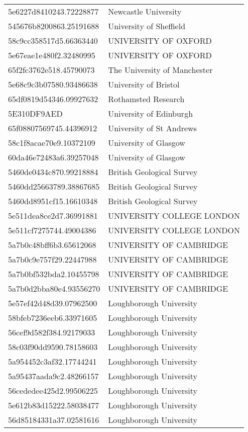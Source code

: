 \begin{tabular}{ll}
5e6227d8410243.72228877 & Newcastle University \\
545676b8200863.25191688 & University of Sheffield \\
58c9cc358517d5.66363440 & UNIVERSITY OF OXFORD \\
5e67eae1e480f2.32480995 & UNIVERSITY OF OXFORD \\
65f2fc3762e518.45790073 & The University of Manchester \\
5e68c9c3b07580.93486638 & University of Bristol \\
65df0819d54346.09927632 & Rothamsted Research \\
5E310DF9AED & University of Edinburgh \\
65f08807569745.44396912 & University of St Andrews \\
58c1f8acae70e9.10372109 & University of Glasgow \\
60da46e72483a6.39257048 & University of Glasgow \\
5460de0434c870.99218884 & British Geological Survey \\
5460dd25663789.38867685 & British Geological Survey \\
5460dd8951cf15.16610348 & British Geological Survey \\
5e511dea8ce2d7.36991881 & UNIVERSITY COLLEGE LONDON \\
5e511cf7275744.49004386 & UNIVERSITY COLLEGE LONDON \\
5a7b0c48bff6b3.65612068 & UNIVERSITY OF CAMBRIDGE \\
5a7b0c9e757f29.22447988 & UNIVERSITY OF CAMBRIDGE \\
5a7b0bf532bda2.10455798 & UNIVERSITY OF CAMBRIDGE \\
5a7b0d2bba80e4.93556270 & UNIVERSITY OF CAMBRIDGE \\
5e57ef42d48d39.07962500 & Loughborough University \\
58bfeb7236eeb6.33971605 & Loughborough University \\
56cef9d582f384.92179033 & Loughborough University \\
58c03f90dd9590.78158603 & Loughborough University \\
5a954452c3af32.17744241 & Loughborough University \\
5a95437aada9c2.48266157 & Loughborough University \\
56cededee425d2.99506225 & Loughborough University \\
5e612b83d15222.58038477 & Loughborough University \\
56d85184331a37.02581616 & Loughborough University \\

\end{tabular}
